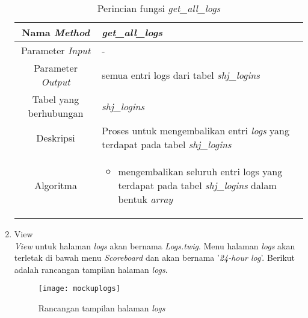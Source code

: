 \begin{enumerate}
	\begin{table}[H]
		\caption{Perincian fungsi \textit{get\_all\_logs}}
		\begin{tabular}{|c|p{11cm}|}
			\hline
			Nama \textit{Method} 	& 	\textit{get\_all\_logs} 	\\
			\hline
			Parameter \textit{Input} & - \\
			\hline
			Parameter \textit{Output} &  semua entri logs dari tabel \textit{shj\_logins}\\
			\hline
			Tabel yang berhubungan & \textit{shj\_logins} \\
			\hline
			Deskripsi	& Proses untuk mengembalikan entri \textit{logs} yang terdapat pada tabel \textit{shj\_logins} \\
			\hline
			Algoritma	& \begin{itemize}
				\item mengembalikan seluruh entri logs yang terdapat pada tabel \textit{shj\_logins} dalam bentuk \textit{array}
			\end{itemize} \\
			\hline
		\end{tabular}
	\end{table}

	\item View \\
	\textit{View} untuk halaman \textit{logs} akan bernama \textit{Logs.twig}. Menu halaman \textit{logs} akan terletak di bawah menu \textit{Scoreboard} dan akan bernama '\textit{24-hour log}'. Berikut adalah rancangan tampilan halaman \textit{logs}.
	
	\begin{figure}[H]
		\centering  
		\texttt{[image: mockuplogs]}  
		\caption[Rancangan tampilan halaman \textit{logs}]{Rancangan tampilan halaman \textit{logs}} 
		\label{fig:mockuplogs} 
	\end{figure}


\end{enumerate}
